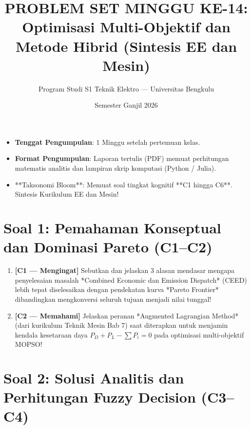 \documentclass[11pt,a4paper]{article}
\title{\vspace{-1cm}\textbf{PROBLEM SET MINGGU KE-14:}\\Optimisasi Multi-Objektif dan Metode Hibrid (Sintesis EE dan Mesin)}
\author{Program Studi S1 Teknik Elektro --- Universitas Bengkulu}
\date{Semester Ganjil 2026}
\begin{document}
\maketitle

\begin{tcolorbox}[colback=unibgold!10,colframe=unibgold!80!black,title=\textbf{Petunjuk Pengerjaan dan Tenggat Waktu}]
\begin{itemize}[leftmargin=*]
    \item \textbf{Tenggat Pengumpulan}: 1 Minggu setelah pertemuan kelas.
    \item \textbf{Format Pengumpulan}: Laporan tertulis (PDF) memuat perhitungan matematis analitis dan lampiran skrip komputasi (Python / Julia).
    \item **Taksonomi Bloom**: Memuat soal tingkat kognitif **C1 hingga C6**. Sintesis Kurikulum EE dan Mesin!
\end{itemize}
\end{tcolorbox}

\vspace{0.3cm}

\section*{Soal 1: Pemahaman Konseptual dan Dominasi Pareto (C1--C2)}

\begin{enumerate}[label=\textbf{1.\arabic*}, leftmargin=*]
    \item \textbf{[C1 --- Mengingat]} Sebutkan dan jelaskan 3 alasan mendasar mengapa penyelesaian masalah *Combined Economic dan Emission Dispatch* (CEED) lebih tepat diselesaikan dengan pendekatan kurva *Pareto Frontier* dibandingkan mengkonversi seluruh tujuan menjadi nilai tunggal!
    
    \item \textbf{[C2 --- Memahami]} Jelaskan peranan *Augmented Lagrangian Method* (dari kurikulum Teknik Mesin Bab 7) saat diterapkan untuk menjamin kendala kesetaraan daya $P_D + P_L - \sum P_i = 0$ pada optimisasi multi-objektif MOPSO!
\end{enumerate}

\section*{Soal 2: Solusi Analitis dan Perhitungan Fuzzy Decision (C3--C4)}
\end{document}
